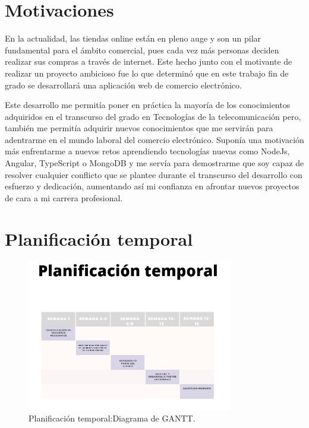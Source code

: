 \documentclass[a4paper, 12pt]{book}
\begin{document}
\section{Motivaciones}
\label{sec:motivaciones}
En la actualidad, las tiendas online están en pleno auge y son un pilar fundamental para el ámbito comercial, pues cada vez más personas deciden realizar sus compras a través de internet. Este hecho junto con el motivante de realizar un proyecto ambicioso fue lo que determinó que en este trabajo fin de grado se desarrollará una aplicación web de comercio electrónico. 

Este desarrollo me permitía poner en práctica la mayoría de los conocimientos adquiridos en el transcurso del grado en Tecnologías de la telecomunicación pero, también me permitía adquirir nuevos conocimientos que me servirán para adentrarme en el mundo laboral del comercio electrónico. Suponía una motivación más enfrentarme a nuevos retos aprendiendo tecnologías nuevas como NodeJs, Angular, TypeScript o MongoDB y me servía para demostrarme que soy capaz de resolver cualquier conflicto que se plantee durante el transcurso del desarrollo con esfuerzo y dedicación, aumentando así mi confianza en afrontar nuevos proyectos de cara a mi carrera profesional. 

\section{Planificación temporal}
\label{sec:planificacion-temporal}


\begin{figure}[H]
  \centering
  \includegraphics[width=9cm, keepaspectratio]{img/planificacion_temporal}
  \caption{Planificación temporal:Diagrama de GANTT.}
  \label{fig:GANTT}
\end{figure}


\end{document}
